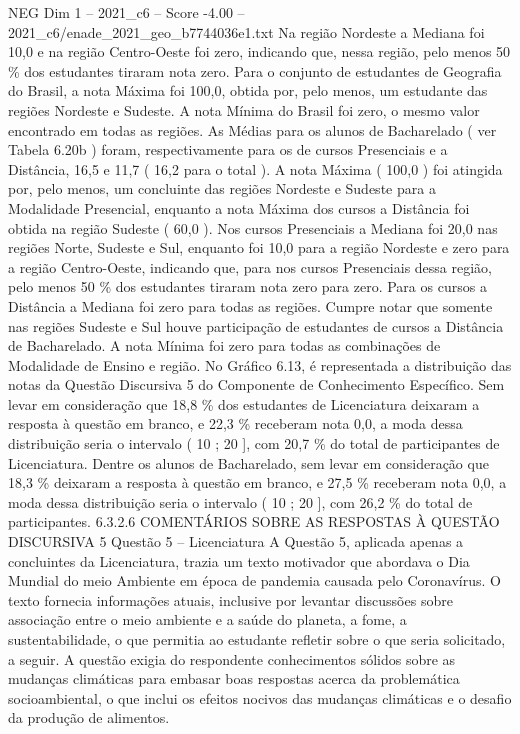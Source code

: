 \begin{textsample}{NEG Dim 1 – 2021\_c6 – Score -4.00 – 2021\_c6/enade\_2021\_geo\_b7744036e1.txt}
Na região Nordeste a Mediana foi 10,0 e na região Centro-Oeste foi zero, indicando que, nessa região, pelo menos 50 \% dos estudantes tiraram nota zero.
Para o conjunto de estudantes de Geografia do Brasil, a nota Máxima foi 100,0, obtida por, pelo menos, um estudante das regiões Nordeste e Sudeste.
A nota Mínima do Brasil foi zero, o mesmo valor encontrado em todas as regiões.
As Médias para os alunos de Bacharelado ( ver Tabela 6.20b ) foram, respectivamente para os de cursos Presenciais e a Distância, 16,5 e 11,7 ( 16,2 para o total ).
A nota Máxima ( 100,0 ) foi atingida por, pelo menos, um concluinte das regiões Nordeste e Sudeste para a Modalidade Presencial, enquanto a nota Máxima dos cursos a Distância foi obtida na região Sudeste ( 60,0 ).
Nos cursos Presenciais a Mediana foi 20,0 nas regiões Norte, Sudeste e Sul, enquanto foi 10,0 para a região Nordeste e zero para a região Centro-Oeste, indicando que, para nos cursos Presenciais dessa região, pelo menos 50 \% dos estudantes tiraram nota zero para zero.
Para os cursos a Distância a Mediana foi zero para todas as regiões.
Cumpre notar que somente nas regiões Sudeste e Sul houve participação de estudantes de cursos a Distância de Bacharelado.
A nota Mínima foi zero para todas as combinações de Modalidade de Ensino e região.
No Gráfico 6.13, é representada a distribuição das notas da Questão Discursiva 5 do Componente de Conhecimento Específico.
Sem levar em consideração que 18,8 \% dos estudantes de Licenciatura deixaram a resposta à questão em branco, e 22,3 \% receberam nota 0,0, a moda dessa distribuição seria o intervalo ( 10 ; 20 ], com 20,7 \% do total de participantes de Licenciatura.
Dentre os alunos de Bacharelado, sem levar em consideração que 18,3 \% deixaram a resposta à questão em branco, e 27,5 \% receberam nota 0,0, a moda dessa distribuição seria o intervalo ( 10 ; 20 ], com 26,2 \% do total de participantes. 6.3.2.6 COMENTÁRIOS SOBRE AS RESPOSTAS À QUESTÃO DISCURSIVA 5 Questão 5 – Licenciatura A Questão 5, aplicada apenas a concluintes da Licenciatura, trazia um texto motivador que abordava o Dia Mundial do meio Ambiente em época de pandemia causada pelo Coronavírus.
O texto fornecia informações atuais, inclusive por levantar discussões sobre associação entre o meio ambiente e a saúde do planeta, a fome, a sustentabilidade, o que permitia ao estudante refletir sobre o que seria solicitado, a seguir.
A questão exigia do respondente conhecimentos sólidos sobre as mudanças climáticas para embasar boas respostas acerca da problemática socioambiental, o que inclui os efeitos nocivos das mudanças climáticas e o desafio da produção de alimentos.

\end{textsample}
